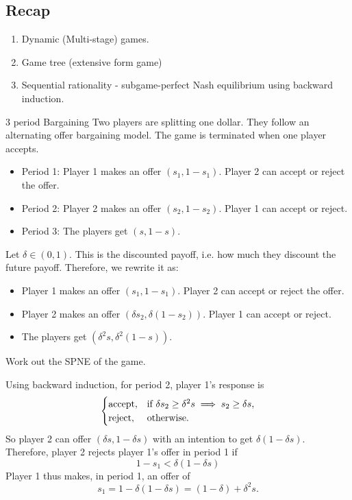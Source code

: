 \newsection
\subsection*{Recap}
\begin{enumerate}
    \item Dynamic (Multi-stage) games.
    \item Game tree (extensive form game)
    \item Sequential rationality - subgame-perfect Nash equilibrium using backward induction.
\end{enumerate}

\begin{aexample}{3 period Bargaining}{}
    Two players are splitting one dollar. 
    They follow an alternating offer bargaining model. The game is terminated when one player accepts.
    
    \begin{itemize}
        \item Period 1: Player 1 makes an offer $(s_1,1-s_1)$. Player 2 can accept or reject the offer.
        \item Period 2: Player 2 makes an offer $(s_2,1-s_2)$. Player 1 can accept or reject.
        \item Period 3: The players get $(s,1-s)$.
    \end{itemize}

    Let $\delta\in(0,1)$. This is the discounted payoff, i.e. how much they discount the future payoff. Therefore, we rewrite it as:
    \begin{itemize}
        \item [1:] Player 1 makes an offer $(s_1,1-s_1)$. Player 2 can accept or reject the offer.
        \item [2:] Player 2 makes an offer $(\delta s_2,\delta(1-s_2))$. Player 1 can accept or reject.
        \item [3:] The players get $(\delta^2 s,\delta^2(1-s))$.
    \end{itemize}
    Work out the SPNE of the game.
\end{aexample}
Using backward induction, for period 2, player 1's response is \[
\begin{cases}
    \rm{accept,} & \textrm{if }\delta s_2\geq \delta^2s\implies s_2\geq \delta s,\\
    \rm{reject,} & \textrm{otherwise.} 
\end{cases}
\]
So player 2 can offer $(\delta s, 1-\delta s)$ with an intention to get $\delta (1-\delta s)$.
Therefore, player 2 rejects player 1's offer in period 1 if \[
1-s_1<\delta (1-\delta s)
\]
Player 1 thus makes, in period 1, an offer of \[
s_1= 1-\delta(1-\delta s)=(1-\delta) + \delta^2 s.
\]

